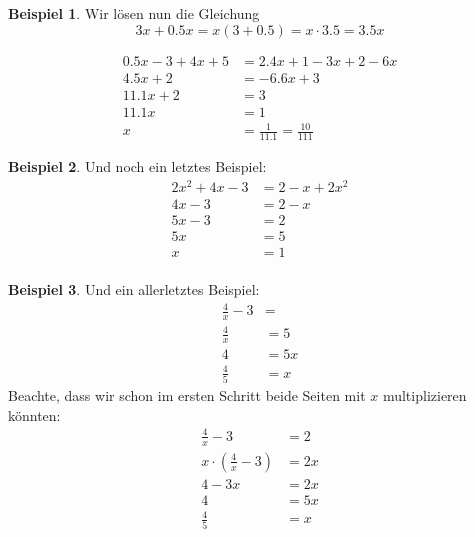 \documentclass[%
11pt,%
twoside,%
titlepage,%
swissgerman,%
headsepline%
]{scrartcl}
\theoremstyle{definition}
\newtheorem{bsp}{Beispiel}[subsection] %
\theoremstyle{plain}
\begin{document}
\begin{bsp}
Wir lösen nun die Gleichung
                $$3x+0.5x=x(3+0.5)=x\cdot 3.5=3.5x$$
                
                \begin{align*}
                0.5 x-3 +4x +5& = 2.4 x+1 -3x+2-6x\\
                4.5 x +2 & = -6.6x +3\tag{$+6.6x$}\\
                11.1 x +2 & = 3\tag{$-2$}\\
                11.1 x & =1\tag{$\div11.1$}\\
                x & = \frac{1}{11.1}=\frac{10}{111}
                \end{align*}
\end{bsp}           

\begin{bsp}
Und noch ein letztes Beispiel:
                \begin{align*}
                2x^2+4x-3 &=  2-x+2x^2 \tag{$-2x^2$}\\
                4x -3 & = 2-x\tag{$+x$}\\
                5x -3 & = 2\tag{$+3$}\\
                5x & = 5\tag{$\div5$}\\
                x &= {1}\\
                \end{align*}
\end{bsp}           

\begin{bsp}
Und ein allerletztes Beispiel: 
                \begin{align*}
                \frac{4}{x}-3 &= \tag{$+3$}\\
                \frac{4}{x} & = 5\tag{$\cdot x$}\\
                4 & =  5x\tag{$\div5$}\\
                {\frac{4}{5}}& = x  
                \end{align*}
                Beachte, dass wir schon im ersten Schritt beide Seiten mit $x$ multiplizieren könnten:
                \begin{align*}
                \frac{4}{x}-3 &= 2\tag{$\cdot x$}\\
                x\cdot (\frac{4}{x}-3) & = 2x \\
                4-3x & = 2x\tag{$+3x$}\\
                4 & =  5x\tag{$\div5$}\\
                {\frac{4}{5}}& = x  
                \end{align*}
\end{bsp}
\end{document}
